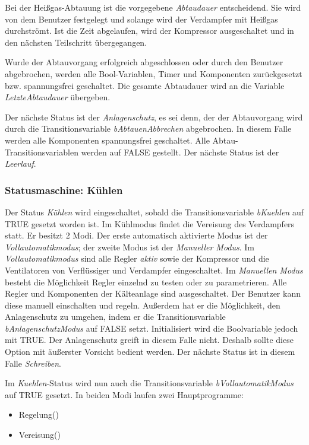 Bei der Heißgas-Abtauung ist die vorgegebene \textit{Abtaudauer} entscheidend. Sie wird von dem Benutzer festgelegt und solange wird der Verdampfer mit Heißgas durchströmt. Ist die Zeit abgelaufen, wird der Kompressor ausgeschaltet und in den nächsten Teilschritt übergegangen. 

Wurde der Abtauvorgang erfolgreich abgeschlossen oder durch den Benutzer abgebrochen, werden alle Bool-Variablen, Timer und Komponenten zurückgesetzt bzw. spannungsfrei geschaltet. Die gesamte Abtaudauer wird an die Variable \textit{LetzteAbtaudauer} übergeben. 


Der nächste Status ist der \textit{Anlagenschutz}, es sei denn, der der Abtauvorgang wird durch die Transitionsvariable \textit{bAbtauenAbbrechen} abgebrochen. In diesem Falle werden alle Komponenten spannungsfrei geschaltet. Alle Abtau-Transitionsvariablen werden auf FALSE gestellt. Der nächste Status ist der \textit{Leerlauf}. 

\subsubsection*{Statusmaschine: Kühlen}

Der Status \textit{Kühlen} wird eingeschaltet, sobald die Transitionsvariable \textit{bKuehlen} auf TRUE gesetzt worden ist. Im Kühlmodus findet die Vereisung des Verdampfers statt. Er besitzt 2 Modi. Der erste automatisch aktivierte Modus ist der \textit{Vollautomatikmodus}; der zweite Modus ist der \textit{Manueller Modus}. 
Im \textit{Vollautomatikmodus} sind alle Regler \textit{aktiv} sowie der Kompressor und die Ventilatoren von Verflüssiger und Verdampfer eingeschaltet. 
Im \textit{Manuellen Modus} besteht die Möglichkeit Regler einzelnd zu testen oder zu parametrieren. Alle Regler und Komponenten der Kälteanlage sind ausgeschaltet. Der Benutzer kann diese manuell einschalten und regeln. Außerdem hat er die Möglichkeit, den Anlagenschutz zu umgehen, indem er die Transitionsvariable \textit{bAnlagenschutzModus} auf FALSE setzt. Initialisiert wird die Boolvariable jedoch mit TRUE. Der Anlagenschutz greift in diesem Falle nicht. Deshalb sollte diese Option mit äußerster Vorsicht bedient werden. Der nächste Status ist in diesem Falle \textit{Schreiben}. 

Im \textit{Kuehlen}-Status wird nun auch die Transitionsvariable \textit{bVollautomatikModus} auf TRUE gesetzt. In beiden Modi laufen zwei Hauptprogramme:

\begin{itemize}
\item	Regelung()
\item 	Vereisung()
\end{itemize}

